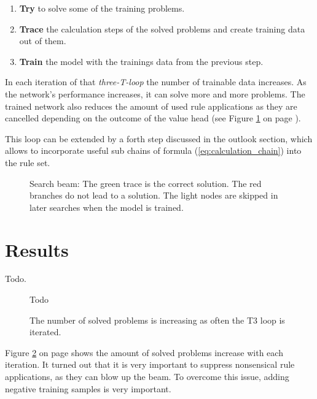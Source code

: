 \documentclass{scrartcl}
\theoremstyle{definition}
\begin{document}

\begin{enumerate}[label=(\roman*)]
	\item \textbf{Try} to solve some of the training problems.
	\item \textbf{Trace} the calculation steps of the solved problems and create training data out of them.
	\item \textbf{Train} the model with the trainings data from the previous step.
\end{enumerate}

In each iteration of that \textit{three-T-loop} the number of trainable data increases. 
As the network's performance increases, it can solve more and more problems.
The trained network also reduces the amount of used rule applications as they are cancelled depending on the outcome of the value head (see Figure \ref{fig:beam_search} on page \pageref{fig:beam_search}). 


This loop can be extended by a forth step discussed in the outlook section, which allows to incorporate useful sub chains of formula (\ref{eq:calculation_chain}) into the rule set.

\begin{figure}[!htbp]
	\centering
	
	\caption{Search beam: The green trace is the correct solution.
	The red branches do not lead to a solution.
	The light nodes are skipped in later searches when the model is trained.}
	\label{fig:beam_search}
\end{figure}


\section{Results}

Todo.

\begin{figure}[!htbp]
	\centering
	Todo
	\caption{The number of solved problems is increasing as often the T3 loop is iterated.}
	\label{fig:t3loop_performance}
\end{figure}

Figure \ref{fig:t3loop_performance} on page \pageref{fig:t3loop_performance} shows the amount of solved problems increase with each iteration. 
It turned out that it is very important to suppress nonsensical rule applications, as they can blow up the beam.
To overcome this issue, adding negative training samples is very important.
\end{document}
